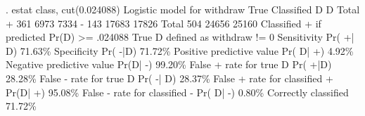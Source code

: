. estat class, cut(0.024088)
{\smallskip}
Logistic model for withdraw
{\smallskip}
               True 
Classified {\VBAR}         D            {\tytilde}D  {\VBAR}      Total
     +     {\VBAR}       361          6973  {\VBAR}       7334
     -     {\VBAR}       143         17683  {\VBAR}      17826
   Total   {\VBAR}       504         24656  {\VBAR}      25160
{\smallskip}
Classified + if predicted Pr(D) >= .024088
True D defined as withdraw != 0
Sensitivity                     Pr( +| D)   71.63\%
Specificity                     Pr( -|{\tytilde}D)   71.72\%
Positive predictive value       Pr( D| +)    4.92\%
Negative predictive value       Pr({\tytilde}D| -)   99.20\%
False + rate for true {\tytilde}D        Pr( +|{\tytilde}D)   28.28\%
False - rate for true D         Pr( -| D)   28.37\%
False + rate for classified +   Pr({\tytilde}D| +)   95.08\%
False - rate for classified -   Pr( D| -)    0.80\%
Correctly classified                        71.72\%
{\smallskip}

